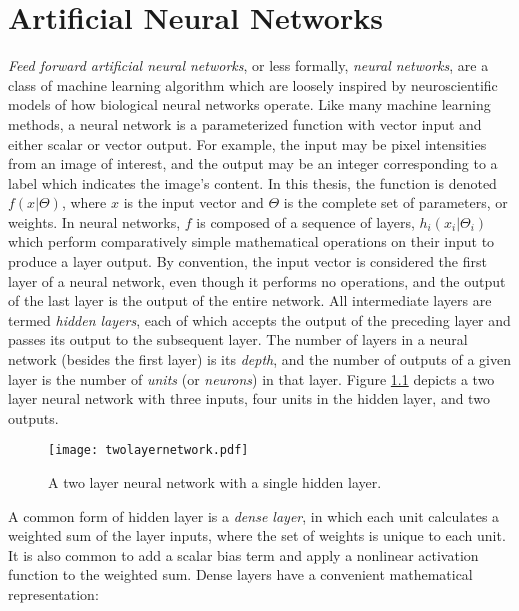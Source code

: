 \chapter{Artificial Neural Networks}
\label{chap:neuralnetworks}

\textit{Feed forward artificial neural networks}, or less formally, \textit{neural networks}, are a class of machine learning algorithm which are loosely inspired by neuroscientific models of how biological neural networks operate\cite{mcculloch1943}. 
Like many machine learning methods, a neural network is a parameterized function with vector input and either scalar or vector output.
For example, the input may be pixel intensities from an image of interest, and the output may be an integer corresponding to a label which indicates the image's content.
In this thesis, the function is denoted $f(x|\Theta)$, where $x$ is the input vector and $\Theta$ is the complete set of parameters, or weights.
In neural networks, $f$ is composed of a sequence of layers, $h_i(x_i|\Theta_i)$ which perform comparatively simple mathematical operations on their input to produce a layer output.
By convention, the input vector is considered the first layer of a neural network, even though it performs no operations, and the output of the last layer is the output of the entire network.
All intermediate layers are termed \textit{hidden layers}, each of which accepts the output of the preceding layer and passes its output to the subsequent layer.
The number of layers in a neural network (besides the first layer) is its \textit{depth}, and the number of outputs of a given layer is the number of \textit{units} (or \textit{neurons}) in that layer.
Figure \ref{fig:twolayernetwork} depicts a two layer neural network with three inputs, four units in the hidden layer, and two outputs.

\begin{figure}
	\centering
	\texttt{[image: twolayernetwork.pdf]}
	\caption{A two layer neural network with a single hidden layer.}
	\label{fig:twolayernetwork}
\end{figure}

A common form of hidden layer is a \textit{dense layer}, in which each unit calculates a weighted sum of the layer inputs, where the set of weights is unique to each unit.
It is also common to add a scalar bias term and apply a nonlinear activation function to the weighted sum.
Dense layers have a convenient mathematical representation:

